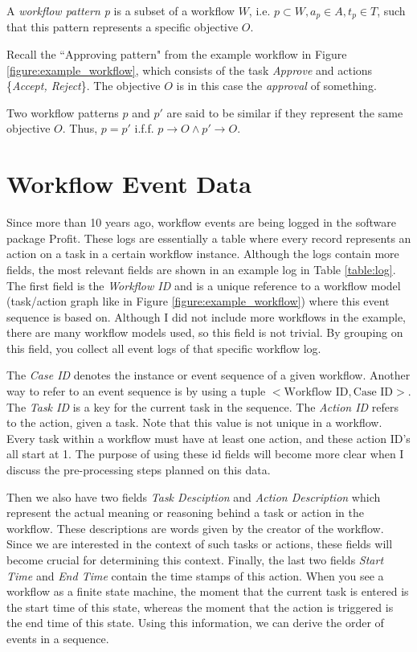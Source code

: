 \documentclass[a4paper,11pt]{article}
\begin{document}
\begin{defn}
A \textit{workflow pattern p} is a subset of a workflow $W$, i.e. $p \subset W, a_p \in A, t_p \in T$, such that this pattern represents a specific objective $O$.
\end{defn}
Recall the ``Approving pattern" from the example workflow in Figure \ref{figure:example_workflow}, which consists of the task \textit{Approve} and actions \{\textit{Accept, Reject}\}. The objective $O$ is in this case the \textit{approval} of something.

\begin{defn}
Two workflow patterns $p$ and $p'$ are said to be similar if they represent the same objective $O$. Thus, $p=p'$ i.f.f. $p \rightarrow O \wedge p' \rightarrow O$.
\end{defn}

\section{Workflow Event Data}
Since more than 10 years ago, workflow events are being logged in the software package Profit. These logs are essentially a table where every record represents an action on a task in a certain workflow instance. Although the logs contain more fields, the most relevant fields are shown in an example log in Table \ref{table:log}. The first field is the \textit{Workflow ID} and is a unique reference to a workflow model (task/action graph like in Figure \ref{figure:example_workflow}) where this event sequence is based on. Although I did not include more workflows in the example, there are many workflow models used, so this field is not trivial. By grouping on this field, you collect all event logs of that specific workflow log.

The \textit{Case ID} denotes the instance or event sequence of a given workflow. Another way to refer to an event sequence is by using a tuple $<\text{Workflow ID}, \text{Case ID}>$. The \textit{Task ID} is a key for the current task in the sequence. The \textit{Action ID} refers to the action, given a task. Note that this value is not unique in a workflow. Every task within a workflow must have at least one action, and these action ID's all start at 1. The purpose of using these id fields will become more clear when I discuss the pre-processing steps planned on this data.

Then we also have two fields \textit{Task Desciption} and \textit{Action Description} which represent the actual meaning or reasoning behind a task or action in the workflow. These descriptions are words given by the creator of the workflow. Since we are interested in the context of such tasks or actions, these fields will become crucial for determining this context.
Finally, the last two fields \textit{Start Time} and \textit{End Time} contain the time stamps of this action. When you see a workflow as a finite state machine, the moment that the current task is entered is the start time of this state, whereas the moment that the action is triggered is the end time of this state. Using this information, we can derive the order of events in a sequence.
\end{document}
